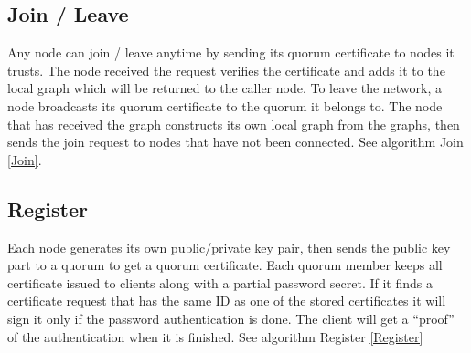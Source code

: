 \subsection{Join / Leave}
Any node can join / leave anytime by sending its quorum certificate to
nodes it trusts. The node received the request verifies the
certificate and adds it to the local graph which will be returned to
the caller node. To leave the network, a node broadcasts its quorum
certificate to the quorum it belongs to.
The node that has received the graph constructs its own local graph
from the graphs, then sends the join request to nodes that have not
been connected.
See algorithm {\sf Join} \ref{Join}.

\subsection{Register}
\label{register}
Each node generates its own public/private key pair, then sends the
public key part to a quorum to get a quorum certificate. Each quorum
member keeps all certificate issued to clients along with a partial
password secret. If it finds a certificate request that has the same
ID as one of the stored certificates it will sign it only if the
password authentication is done. The client will get a ``proof'' of
the authentication when it is finished.
See algorithm {\sf Register} \ref{Register}

